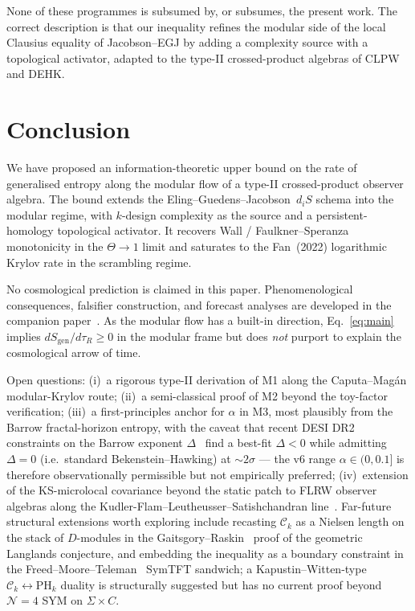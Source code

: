 \documentclass[aps,prd,superscriptaddress,nofootinbib,floatfix,10pt]{revtex4-2}
\theoremstyle{remark}
\newcommand{\Sgen}{S_{\mathrm{gen}}}
\newcommand{\tauR}{\tau_{R}}
\newcommand{\Ck}{\mathcal{C}_{k}}
\newcommand{\PHk}{\mathrm{PH}_{k}}
\begin{document}
None of these programmes is subsumed by, or subsumes, the present
work. The correct description is that our inequality refines the
modular side of the local Clausius equality of Jacobson--EGJ by
adding a complexity source with a topological activator, adapted to
the type-II crossed-product algebras of CLPW and DEHK.

\section{Conclusion}
\label{sec:conclusion}

We have proposed an information-theoretic upper bound on the rate of
generalised entropy along the modular flow of a type-II crossed-product
observer algebra. The bound extends the
Eling--Guedens--Jacobson~$d_{i}S$ schema into the modular regime, with
$k$-design complexity as the source and a persistent-homology
topological activator. It recovers Wall / Faulkner--Speranza
monotonicity in the $\Theta\to 1$ limit and saturates to the Fan~(2022)
logarithmic Krylov rate in the scrambling regime.

No cosmological prediction is claimed in this paper. Phenomenological
consequences, falsifier construction, and forecast analyses are
developed in the companion paper~\cite{Remondiere2026ECIv5}.
As the modular flow has a built-in direction, Eq.~\eqref{eq:main}
implies $d\Sgen/d\tauR \ge 0$ in the modular frame but does \emph{not}
purport to explain the cosmological arrow of time.

Open questions: (i)~a rigorous type-II derivation of M1 along the
Caputa--Mag\'an modular-Krylov route; (ii)~a semi-classical proof of
M2 beyond the toy-factor verification; (iii)~a first-principles
anchor for $\alpha$ in M3, most plausibly from the
Barrow fractal-horizon entropy, with the caveat that recent DESI DR2
constraints on the Barrow exponent $\Delta$~\cite{Barrow2025DESI}
find a best-fit $\Delta < 0$ while admitting $\Delta = 0$
(i.e.\ standard Bekenstein--Hawking) at $\sim 2\sigma$ — the v6
range $\alpha \in (0, 0.1]$ is therefore observationally permissible
but not empirically preferred; (iv)~extension of the KS-microlocal
covariance beyond the static patch to FLRW observer algebras along
the Kudler-Flam--Leutheusser--Satishchandran
line~\cite{KFLS2024}. Far-future structural extensions
worth exploring include recasting $\Ck$ as a Nielsen length on the
stack of $D$-modules in the Gaitsgory--Raskin~\cite{GaitsgoryRaskin2024}
proof of the geometric Langlands conjecture, and embedding the
inequality as a boundary constraint in the
Freed--Moore--Teleman~\cite{FreedMooreTeleman2024} SymTFT sandwich; a
Kapustin--Witten-type $\Ck\leftrightarrow\PHk$ duality is
structurally suggested but has no current proof beyond
$\mathcal{N}=4$ SYM on $\Sigma\times C$.
\end{document}
